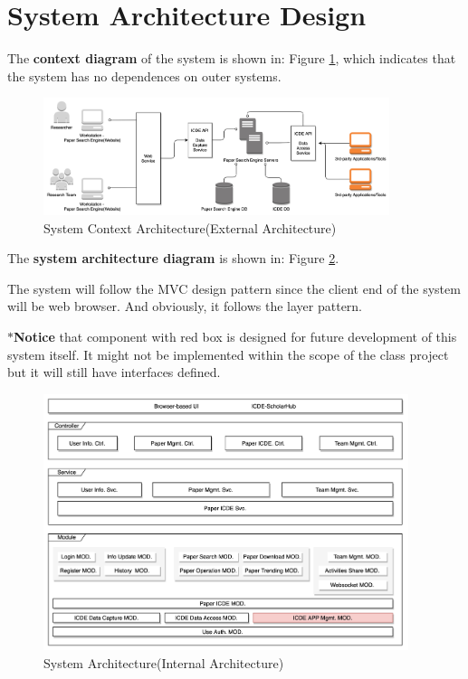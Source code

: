 \section{System Architecture Design}

The \textbf{context diagram} of the system is shown in: Figure \ref{fig:sys-context},
which indicates that the system has no dependences on outer systems.

\begin{figure}[!ht]
	\centering
	\includegraphics[width=0.9\textwidth]{./img/sys-context.png}
	\caption{System Context Architecture(External Architecture)}
	\label{fig:sys-context}
\end{figure}

The \textbf{system architecture diagram} is shown in: Figure \ref{fig:sys-arch}.

The system will follow the MVC design pattern since the client end of the system will be web browser.
And obviously, it follows the layer pattern.

\textbf{$\ast$Notice} that component with {\color{OrangeRed} red box} is designed for future development of this system itself.
It might not be implemented within the scope of the class project but it will still have interfaces defined.

\begin{figure}[!ht]
	\centering
	\includegraphics[width=0.95\textwidth]{./img/sys-arch.jpg}
	\caption{System Architecture(Internal Architecture)}
	\label{fig:sys-arch}
\end{figure}
